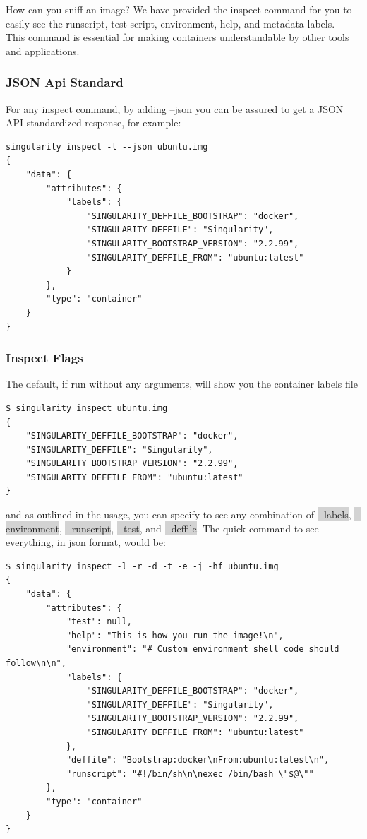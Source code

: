 \documentclass[a4paper]{article}
\begin{document}
How can you sniff an image? We have provided the inspect command for you to easily see the runscript, test script, environment, help, and metadata labels.\\[0.1in]

This command is essential for making containers understandable by other tools and applications.

\subsubsection{JSON Api Standard}

For any inspect command, by adding --json you can be assured to get a JSON API standardized response, for example:

\begin{lstlisting}[frame=single]
singularity inspect -l --json ubuntu.img
{
    "data": {
        "attributes": {
            "labels": {
                "SINGULARITY_DEFFILE_BOOTSTRAP": "docker",
                "SINGULARITY_DEFFILE": "Singularity",
                "SINGULARITY_BOOTSTRAP_VERSION": "2.2.99",
                "SINGULARITY_DEFFILE_FROM": "ubuntu:latest"
            }
        },
        "type": "container"
    }
}
\end{lstlisting}

\subsubsection{Inspect Flags}

The default, if run without any arguments, will show you the container labels file

\begin{lstlisting}[frame=single]
$ singularity inspect ubuntu.img
{
    "SINGULARITY_DEFFILE_BOOTSTRAP": "docker",
    "SINGULARITY_DEFFILE": "Singularity",
    "SINGULARITY_BOOTSTRAP_VERSION": "2.2.99",
    "SINGULARITY_DEFFILE_FROM": "ubuntu:latest"
}
\end{lstlisting}

and as outlined in the usage, you can specify to see any combination of \colorbox{lightgray}{-{}-labels}, \colorbox{lightgray}{-{}-environment}, \colorbox{lightgray}{-{}-runscript}, \colorbox{lightgray}{-{}-test}, and \colorbox{lightgray}{-{}-deffile}. The quick command to see everything, in json format, would be:

\begin{lstlisting}[frame=single]
$ singularity inspect -l -r -d -t -e -j -hf ubuntu.img
{
    "data": {
        "attributes": {
            "test": null,
            "help": "This is how you run the image!\n",
            "environment": "# Custom environment shell code should follow\n\n",
            "labels": {
                "SINGULARITY_DEFFILE_BOOTSTRAP": "docker",
                "SINGULARITY_DEFFILE": "Singularity",
                "SINGULARITY_BOOTSTRAP_VERSION": "2.2.99",
                "SINGULARITY_DEFFILE_FROM": "ubuntu:latest"
            },
            "deffile": "Bootstrap:docker\nFrom:ubuntu:latest\n",
            "runscript": "#!/bin/sh\n\nexec /bin/bash \"$@\""
        },
        "type": "container"
    }
}
\end{lstlisting}
\end{document}
